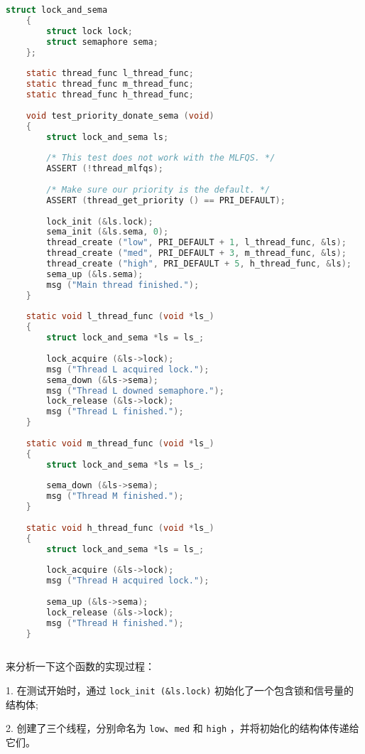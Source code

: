 \documentclass{article}
\begin{document}
	\begin{lstlisting}[language=C, title=\texttt{priority-donate-sema}测试]
    struct lock_and_sema 
    {
    	struct lock lock;
    	struct semaphore sema;
    };
    
    static thread_func l_thread_func;
    static thread_func m_thread_func;
    static thread_func h_thread_func;
    
    void test_priority_donate_sema (void) 
    {
    	struct lock_and_sema ls;
    	
    	/* This test does not work with the MLFQS. */
    	ASSERT (!thread_mlfqs);
    	
    	/* Make sure our priority is the default. */
    	ASSERT (thread_get_priority () == PRI_DEFAULT);
    	
    	lock_init (&ls.lock);
    	sema_init (&ls.sema, 0);
    	thread_create ("low", PRI_DEFAULT + 1, l_thread_func, &ls);
    	thread_create ("med", PRI_DEFAULT + 3, m_thread_func, &ls);
    	thread_create ("high", PRI_DEFAULT + 5, h_thread_func, &ls);
    	sema_up (&ls.sema);
    	msg ("Main thread finished.");
    }
    
    static void l_thread_func (void *ls_) 
    {
    	struct lock_and_sema *ls = ls_;
    	
    	lock_acquire (&ls->lock);
    	msg ("Thread L acquired lock.");
    	sema_down (&ls->sema);
    	msg ("Thread L downed semaphore.");
    	lock_release (&ls->lock);
    	msg ("Thread L finished.");
    }
    
    static void m_thread_func (void *ls_) 
    {
    	struct lock_and_sema *ls = ls_;
    	
    	sema_down (&ls->sema);
    	msg ("Thread M finished.");
    }
    
    static void h_thread_func (void *ls_) 
    {
    	struct lock_and_sema *ls = ls_;
    	
    	lock_acquire (&ls->lock);
    	msg ("Thread H acquired lock.");
    	
    	sema_up (&ls->sema);
    	lock_release (&ls->lock);
    	msg ("Thread H finished.");
    }
		
	\end{lstlisting}
	
	来分析一下这个函数的实现过程：
	
	1. 在测试开始时，通过 \texttt{lock\_init (\&ls.lock)} 初始化了一个包含锁和信号量的结构体;
	
	2. 创建了三个线程，分别命名为 \texttt{low}、\texttt{med} 和 \texttt{high} ，并将初始化的结构体传递给它们。
	
\end{document}
